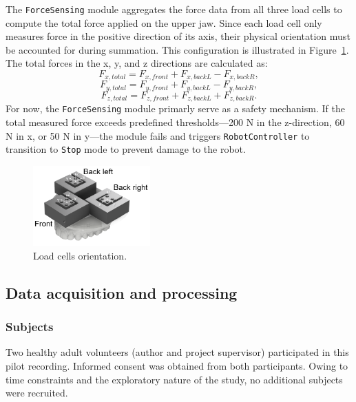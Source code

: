 The \texttt{ForceSensing} module aggregates the force data from all three load cells to compute the total force applied on the upper jaw. 
Since each load cell only measures force in the positive direction of its axis, their physical orientation must be accounted for during summation. 
This configuration is illustrated in Figure~\ref{fig:load_cells_axis}. The total forces in the x, y, and z directions are calculated as:
\begin{equation}
  F_{x,total} = F_{x,front} + F_{x,backL} - F_{x,backR},
\end{equation}
\begin{equation}
  F_{y,total} = F_{y,front} + F_{y,backL} - F_{y,backR},
\end{equation}
\begin{equation}
  F_{z,total} = F_{z,front} + F_{z,backL} + F_{z,backR}.
\end{equation}
For now, the \texttt{ForceSensing} module primarly serve as a safety mechanism. If the total measured force exceeds predefined 
thresholds—200 N in the z-direction, 60 N in x, or 50 N in y—the module fails and triggers \texttt{RobotController} to transition to \texttt{Stop} mode 
to prevent damage to the robot.

\begin{figure}[H]
\centering
\includegraphics[width=0.4\textwidth]{figures/load_cells_axis.drawio.png}
\caption{Load cells orientation.}
\label{fig:load_cells_axis}
\end{figure}

\subsection{Data acquisition and processing}
\label{sec:motion-capture}

\subsubsection{Subjects} 
Two healthy adult volunteers (author and project supervisor) participated in this pilot recording. Informed consent was obtained from both participants. 
Owing to time constraints and the exploratory nature of the study, no additional subjects were recruited. 

